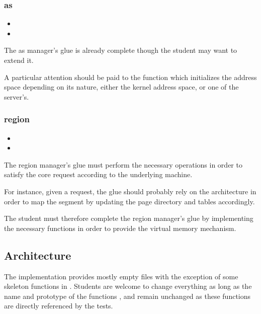 \subsubsection*{as}

\begin{itemize}
  \item
  \item
\end{itemize}

The as manager's glue is already complete though the student may want to extend
it.

A particular attention should be paid to the 
function which initializes the address space depending on its nature,
either the kernel address space, or one of the server's.

\subsubsection*{region}

\begin{itemize}
  \item
  \item
\end{itemize}

The region manager's glue must perform the necessary operations in order to
satisfy the core request according to the underlying machine.

For instance, given a  request, the glue should
probably rely on the architecture in order to map the segment by updating
the page directory and tables accordingly.

The student must therefore complete the region manager's glue by implementing
the necessary functions in order to provide the virtual memory mechanism.

\subsection{Architecture}

The  implementation provides mostly empty files
with the exception of some skeleton functions in .
Students are welcome to change everything as long as the name and prototype
of the functions ,
 and 
remain unchanged as these functions are directly referenced by the tests.

